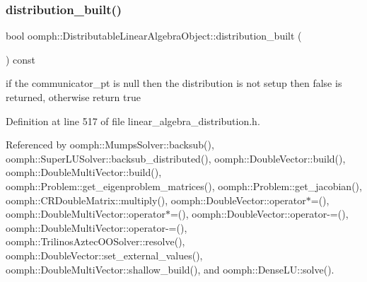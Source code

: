 \mbox{\label{classoomph_1_1DistributableLinearAlgebraObject_a8c35baa65e335043f62954c92c090a5a}} 
\subsubsection{\texorpdfstring{distribution\+\_\+built()}{distribution\_built()}}
{\footnotesize\ttfamily bool oomph\+::\+Distributable\+Linear\+Algebra\+Object\+::distribution\+\_\+built (\begin{DoxyParamCaption}{ }\end{DoxyParamCaption}) const\hspace{0.3cm}{\ttfamily [inline]}}

if the communicator\+\_\+pt is null then the distribution is not setup then false is returned, otherwise return true 

Definition at line 517 of file linear\+\_\+algebra\+\_\+distribution.\+h.



Referenced by oomph\+::\+Mumps\+Solver\+::backsub(), oomph\+::\+Super\+L\+U\+Solver\+::backsub\+\_\+distributed(), oomph\+::\+Double\+Vector\+::build(), oomph\+::\+Double\+Multi\+Vector\+::build(), oomph\+::\+Problem\+::get\+\_\+eigenproblem\+\_\+matrices(), oomph\+::\+Problem\+::get\+\_\+jacobian(), oomph\+::\+C\+R\+Double\+Matrix\+::multiply(), oomph\+::\+Double\+Vector\+::operator$\ast$=(), oomph\+::\+Double\+Multi\+Vector\+::operator$\ast$=(), oomph\+::\+Double\+Vector\+::operator-\/=(), oomph\+::\+Double\+Multi\+Vector\+::operator-\/=(), oomph\+::\+Trilinos\+Aztec\+O\+O\+Solver\+::resolve(), oomph\+::\+Double\+Vector\+::set\+\_\+external\+\_\+values(), oomph\+::\+Double\+Multi\+Vector\+::shallow\+\_\+build(), and oomph\+::\+Dense\+L\+U\+::solve().

\mbox{\label{classoomph_1_1DistributableLinearAlgebraObject_a603105384d60c9a3710378af39f538b9}} 
